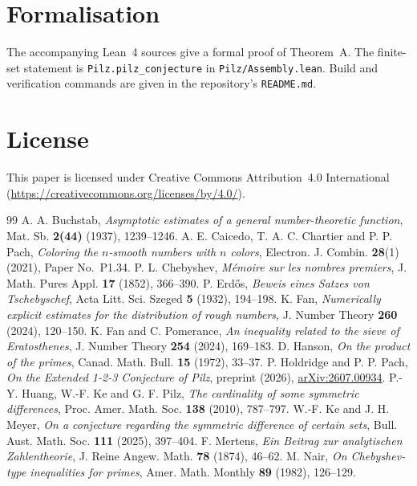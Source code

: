 \documentclass[11pt]{amsart}
\numberwithin{equation}{section}
\theoremstyle{definition}
\theoremstyle{remark}
\begin{document}
\section*{Formalisation}
The accompanying Lean~4 sources give a formal proof of Theorem~A.
The finite-set statement is \texttt{Pilz.pilz\_conjecture} in
\texttt{Pilz/Assembly.lean}. Build and verification commands are given
in the repository's \texttt{README.md}.

\section*{License}
This paper is licensed under Creative Commons Attribution~4.0 International
(\url{https://creativecommons.org/licenses/by/4.0/}).

\begin{thebibliography}{99}
 A. A. Buchstab, \emph{Asymptotic estimates of a general number-theoretic function}, Mat. Sb. \textbf{2(44)} (1937), 1239--1246.
 A. E. Caicedo, T. A. C. Chartier and P. P. Pach, \emph{Coloring the $n$-smooth numbers with $n$ colors}, Electron. J. Combin. \textbf{28}(1) (2021), Paper No.~P1.34.
 P. L. Chebyshev, \emph{M\'emoire sur les nombres premiers}, J. Math. Pures Appl. \textbf{17} (1852), 366--390.
 P. Erd\H{o}s, \emph{Beweis eines Satzes von Tschebyschef}, Acta Litt. Sci. Szeged \textbf{5} (1932), 194--198.
 K. Fan, \emph{Numerically explicit estimates for the distribution of rough numbers}, J. Number Theory \textbf{260} (2024), 120--150.
 K. Fan and C. Pomerance, \emph{An inequality related to the sieve of Eratosthenes}, J. Number Theory \textbf{254} (2024), 169--183.
 D. Hanson, \emph{On the product of the primes}, Canad. Math. Bull. \textbf{15} (1972), 33--37.
 P. Holdridge and P. P. Pach, \emph{On the Extended 1-2-3 Conjecture of Pilz}, preprint (2026), \href{https://arxiv.org/abs/2607.00934}{arXiv:2607.00934}.
 P.-Y. Huang, W.-F. Ke and G. F. Pilz, \emph{The cardinality of some symmetric differences}, Proc. Amer. Math. Soc. \textbf{138} (2010), 787--797.
 W.-F. Ke and J. H. Meyer, \emph{On a conjecture regarding the symmetric difference of certain sets}, Bull. Aust. Math. Soc. \textbf{111} (2025), 397--404.
 F. Mertens, \emph{Ein Beitrag zur analytischen Zahlentheorie}, J. Reine Angew. Math. \textbf{78} (1874), 46--62.
 M. Nair, \emph{On Chebyshev-type inequalities for primes}, Amer. Math. Monthly \textbf{89} (1982), 126--129.

\end{thebibliography}
\end{document}
